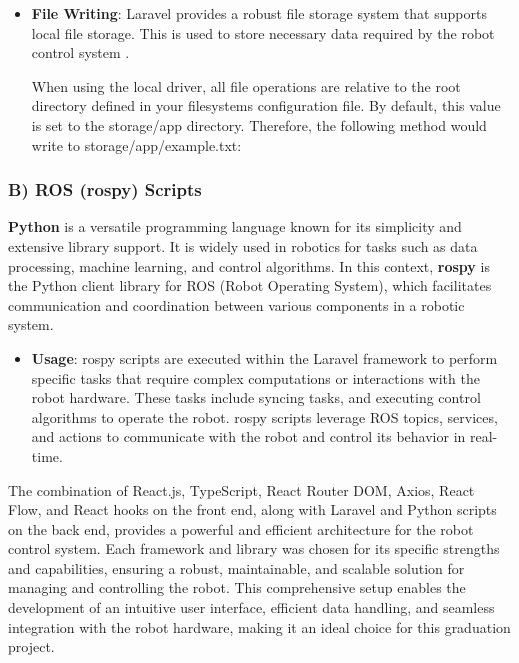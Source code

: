 \begin{itemize}
\begin{itemize}
 \vspace{-4mm}
        
        \item \textbf{File Writing}: Laravel provides a robust file storage system that supports local file storage. This is used to store necessary data required by the robot control system \cite{laravel-filesystem}. 
        
        When using the local driver, all file operations are relative to the root directory defined in your filesystems configuration file. By default, this value is set to the storage/app directory. Therefore, the following method would write to storage/app/example.txt:
        \vspace{1mm}
        
 
    \end{itemize}
\end{itemize}

\vspace{-3mm}

\subsubsection*{B) ROS (rospy) Scripts}

\textbf{Python} is a versatile programming language known for its simplicity and extensive library support. It is widely used in robotics for tasks such as data processing, machine learning, and control algorithms. In this context, \textbf{rospy} is the Python client library for ROS (Robot Operating System), which facilitates communication and coordination between various components in a robotic system.

\begin{itemize}
\item \textbf{Usage}: rospy scripts are executed within the Laravel framework to perform specific tasks that require complex computations or interactions with the robot hardware. These tasks include syncing tasks, and executing control algorithms to operate the robot. rospy scripts leverage ROS topics, services, and actions to communicate with the robot and control its behavior in real-time.
\end{itemize}


The combination of React.js, TypeScript, React Router DOM, Axios, React Flow, and React hooks on the front end, along with Laravel and Python scripts on the back end, provides a powerful and efficient architecture for the robot control system. Each framework and library was chosen for its specific strengths and capabilities, ensuring a robust, maintainable, and scalable solution for managing and controlling the robot. This comprehensive setup enables the development of an intuitive user interface, efficient data handling, and seamless integration with the robot hardware, making it an ideal choice for this graduation project.


